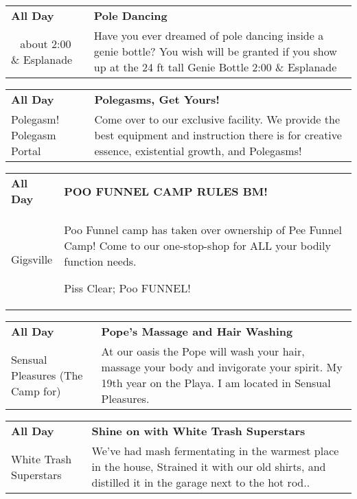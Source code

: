 \begin{tabular}{ p{1in} p{2.2in} }
    \textbf{All Day} & \textbf{Pole Dancing} \\
    ~ \newline about 2:00 \& Esplanade & Have you ever dreamed of pole dancing inside a genie bottle? You wish will be granted if you show up at the 24 ft tall Genie Bottle 2:00 \& Esplanade \\
    \hline 
\end{tabular}
    
\begin{tabular}{ p{1in} p{2.2in} }
    \textbf{All Day} & \textbf{Polegasms, Get Yours!} \\
    Polegasm! \newline Polegasm Portal & Come over to our exclusive facility. We provide the best equipment and instruction there is for creative essence, existential growth, and Polegasms! \\
    \hline 
\end{tabular}
    
\begin{tabular}{ p{1in} p{2.2in} }
    \textbf{All Day} & \textbf{POO FUNNEL CAMP RULES BM!} \\
    Gigsville \newline  & Poo Funnel camp has taken over ownership of Pee Funnel Camp! Come to our one-stop-shop for ALL your bodily function needs.

Piss Clear;
Poo FUNNEL! \\
    \hline 
\end{tabular}
    
\begin{tabular}{ p{1in} p{2.2in} }
    \textbf{All Day} & \textbf{Pope's Massage and Hair Washing} \\
    Sensual Pleasures (The Camp for) \newline  & At our oasis the Pope will wash your hair, massage your body and invigorate your spirit. My 19th year on the Playa. I am located in Sensual Pleasures. \\
    \hline 
\end{tabular}
    
\begin{tabular}{ p{1in} p{2.2in} }
    \textbf{All Day} & \textbf{Shine on with White Trash Superstars} \\
    White Trash Superstars \newline  & We've had mash fermentating in the warmest place in the house, Strained it with our old shirts, and distilled it in the garage next to the hot rod.. \\
    \hline 
\end{tabular}
    
